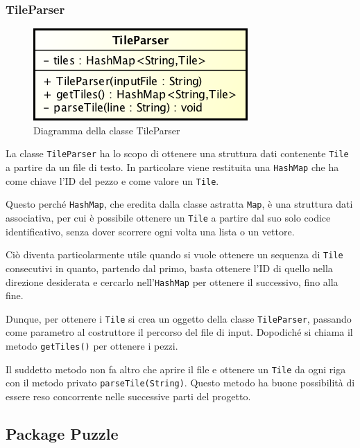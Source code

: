 \documentclass[a4paper, 12pt]{article}
\begin{document}
      \subsubsection{TileParser}

        \begin{figure}[H]

          \centering
          \includegraphics[scale=0.7]{uml/tileparser.png}
          \caption{Diagramma della classe TileParser}
          \label{uml:tileparser}

        \end{figure}

        La classe \verb|TileParser| ha lo scopo di ottenere una struttura dati contenente \verb|Tile| a partire da un file di testo. In particolare viene restituita una \verb|HashMap| che ha come chiave l'ID del pezzo e come valore un \verb|Tile|. 

        Questo perché \verb|HashMap|, che eredita dalla classe astratta \verb|Map|, è una struttura dati associativa, per cui è possibile ottenere un \verb|Tile| a partire dal suo solo codice identificativo, senza dover scorrere ogni volta una lista o un vettore. 

        Ciò diventa particolarmente utile quando si vuole ottenere un sequenza di \verb|Tile| consecutivi in quanto, partendo dal primo, basta ottenere l'ID di quello nella direzione desiderata e cercarlo nell'\verb|HashMap| per ottenere il successivo, fino alla fine.

        Dunque, per ottenere i \verb|Tile| si crea un oggetto della classe \verb|TileParser|, passando come parametro al costruttore il percorso del file di input. Dopodiché si chiama il metodo \verb|getTiles()| per ottenere i pezzi. 

        Il suddetto metodo non fa altro che aprire il file e ottenere un \verb|Tile| da ogni riga con il metodo privato \verb|parseTile(String)|. Questo metodo ha buone possibilità di essere reso concorrente nelle successive parti del progetto.

    \subsection{Package Puzzle}
\end{document}
